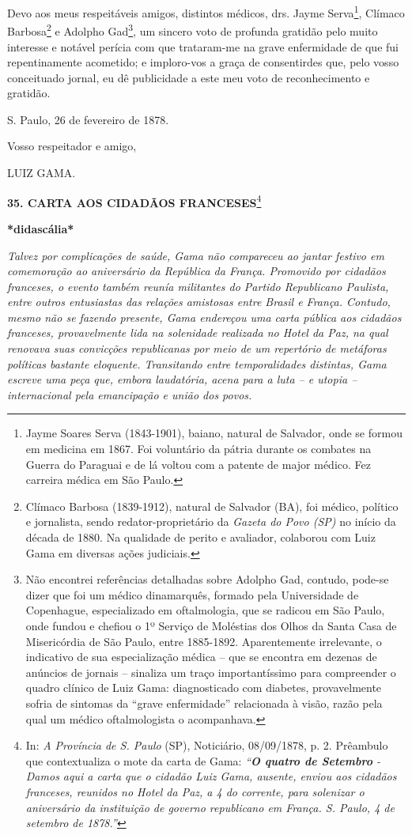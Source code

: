 Devo aos meus respeitáveis amigos, distintos médicos, drs. Jayme
Serva\footnote{Jayme Soares Serva (1843-1901), baiano, natural de
  Salvador, onde se formou em medicina em 1867. Foi voluntário da pátria
  durante os combates na Guerra do Paraguai e de lá voltou com a patente
  de major médico. Fez carreira médica em São Paulo.}, Clímaco
Barbosa\footnote{Clímaco Barbosa (1839-1912), natural de Salvador (BA),
  foi médico, político e jornalista, sendo redator-proprietário da
  \emph{Gazeta do Povo (SP)} no início da década de 1880. Na qualidade
  de perito e avaliador, colaborou com Luiz Gama em diversas ações
  judiciais.} e Adolpho Gad\footnote{Não encontrei referências
  detalhadas sobre Adolpho Gad, contudo, pode-se dizer que foi um médico
  dinamarquês, formado pela Universidade de Copenhague, especializado em
  oftalmologia, que se radicou em São Paulo, onde fundou e chefiou o 1º
  Serviço de Moléstias dos Olhos da Santa Casa de Misericórdia de São
  Paulo, entre 1885-1892. Aparentemente irrelevante, o indicativo de sua
  especialização médica -- que se encontra em dezenas de anúncios de
  jornais -- sinaliza um traço importantíssimo para compreender o quadro
  clínico de Luiz Gama: diagnosticado com diabetes, provavelmente sofria
  de sintomas da ``grave enfermidade'' relacionada à visão, razão pela
  qual um médico oftalmologista o acompanhava.}, um sincero voto de
profunda gratidão pelo muito interesse e notável perícia com que
trataram-me na grave enfermidade de que fui repentinamente acometido; e
imploro-vos a graça de consentirdes que, pelo vosso conceituado jornal,
eu dê publicidade a este meu voto de reconhecimento e gratidão.

S. Paulo, 26 de fevereiro de 1878.

Vosso respeitador e amigo,

LUIZ GAMA.

\textbf{35. CARTA AOS CIDADÃOS FRANCESES}\footnote{In: \emph{A Província
  de S. Paulo} (SP), Noticiário, 08/09/1878, p. 2. Prêambulo que
  contextualiza o mote da carta de Gama: \emph{``\textbf{O quatro de
  Setembro} - Damos aqui a carta que o cidadão Luiz Gama, ausente,
  enviou aos cidadãos franceses, reunidos no Hotel da Paz, a 4 do
  corrente, para solenizar o aniversário da instituição de governo
  republicano em França. S. Paulo, 4 de setembro de 1878.''}}

\textbf{*didascália*}

\emph{Talvez por complicações de saúde, Gama não compareceu ao jantar
festivo em comemoração ao aniversário da República da França. Promovido
por cidadãos franceses, o evento também reunía militantes do Partido
Republicano Paulista, entre outros entusiastas das relações amistosas
entre Brasil e França. Contudo, mesmo não se fazendo presente, Gama
endereçou uma carta pública aos cidadãos franceses, provavelmente lida
na solenidade realizada no Hotel da Paz, na qual renovava suas
convicções republicanas por meio de um repertório de metáforas políticas
bastante eloquente. Transitando entre temporalidades distintas, Gama
escreve uma peça que, embora laudatória, acena para a luta -- e utopia
-- internacional pela emancipação e união dos povos.}

